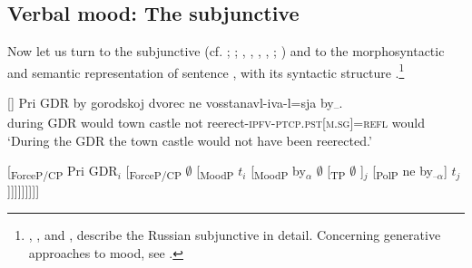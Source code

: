 \documentclass[output=paper,colorlinks,citecolor=brown]{langscibook}
\begin{document}
\begin{otherlanguage}{english}
\subsection{Verbal mood: The subjunctive} \label{sec:zi16:subjunctive}

Now let us turn to the subjunctive (cf. \citealt{Quer1998}; \citealt{Hacquard2006}; \citeauthor{Giannakidou2011} \citeyear{Giannakidou2009}, \citeyear{Giannakidou2011}, \citeyear{Giannakidou2011a}, \citeyear{Giannakidou2014}, \citeyear{Giannakidou2016};  \citealt{Fintel-Heim2011}) and to the morphosyntactic and semantic representation of sentence , with its syntactic structure .\footnote{\textcite{Isacenko1962}, \textcite{Barnetova-Belicova-Krizkova-etal1979}, and \textcite{Svedova1980}, describe the Russian subjunctive in detail. Concerning generative approaches to mood, see \textcite{Ambar2016}.
} 

\begin{exe}
[]{
\gll Pri GDR by\textsubscript{\textalpha} gorodskoj dvorec ne vosstanavl-iva-l=sja by{\textsubscript–}\textsubscript{\textalpha}. \\
during GDR would town castle not reerect-\textsc{ipfv}-\textsc{ptcp}.\textsc{pst}[\textsc{m}.\textsc{sg}]=\textsc{refl} would \\
\glt `During the GDR the town castle would not have been reerected.'}
\end{exe}

\begin{exe}
\ex {} [\textsubscript{ForceP/CP} Pri GDR$_i$ [\textsubscript{ForceP/CP} $\emptyset$ [\textsubscript{MoodP} $t_i$ [\textsubscript{MoodP} by$_\alpha$ $\emptyset$ [\textsubscript{TP} $\emptyset$ \newline [\textsubscript{PolP} [\textsubscript{DP} $\emptyset$ [\textsubscript{NP} gorodskoj dvorec]]$_j$ [\textsubscript{PolP} ne \newline [\textsubscript{VP} [\textsubscript{V'}  [\textsubscript{V}[\textsubscript{V} vosstanavlivalsja] by$_{–\alpha}$] $t_j$ ]]]]]]]]]
\label{ex:16:16}
\end{exe}


\end{otherlanguage}
\end{document}
